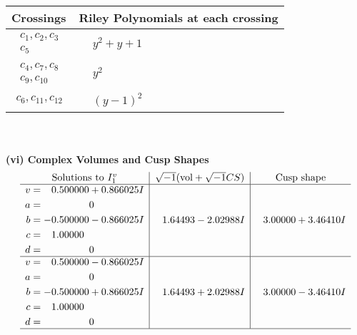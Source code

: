 \documentclass[1p]{elsarticle_modified}
\theoremstyle{definition}
\newcommand{\I}{\sqrt{-1}}
\begin{document}
\begin{tabular}{m{50pt}|m{274pt}}
Crossings & \hspace{64pt}Riley Polynomials at each crossing \\
\hline $$\begin{aligned}c_{1},c_{2},c_{3}\\c_{5}\end{aligned}$$&$\begin{aligned}
&y^2+y+1
\end{aligned}$\\
\hline $$\begin{aligned}c_{4},c_{7},c_{8}\\c_{9},c_{10}\end{aligned}$$&$\begin{aligned}
&y^2
\end{aligned}$\\
\hline $$\begin{aligned}c_{6},c_{11},c_{12}\end{aligned}$$&$\begin{aligned}
&(y-1)^2
\end{aligned}$\\
\hline
\end{tabular}\\~\\
\newpage\flushleft \textbf{(vi) Complex Volumes and Cusp Shapes}
$$\begin{array}{c|c|c}  
\text{Solutions to }I^v_{1}& \I (\text{vol} + \sqrt{-1}CS) & \text{Cusp shape}\\
 \hline 
\begin{aligned}
v &= \phantom{-}0.500000 + 0.866025 I \\
a &= \phantom{-0.000000 } 0 \\
b &= -0.500000 - 0.866025 I \\
c &= \phantom{-}1.00000\phantom{ +0.000000I} \\
d &= \phantom{-0.000000 } 0\end{aligned}
 & \phantom{-}1.64493 - 2.02988 I & \phantom{-}3.00000 + 3.46410 I \\ \hline\begin{aligned}
v &= \phantom{-}0.500000 - 0.866025 I \\
a &= \phantom{-0.000000 } 0 \\
b &= -0.500000 + 0.866025 I \\
c &= \phantom{-}1.00000\phantom{ +0.000000I} \\
d &= \phantom{-0.000000 } 0\end{aligned}
 & \phantom{-}1.64493 + 2.02988 I & \phantom{-}3.00000 - 3.46410 I\\
 \hline 
 \end{array}$$\newpage\newpage\renewcommand{\arraystretch}{1}
\end{document}
